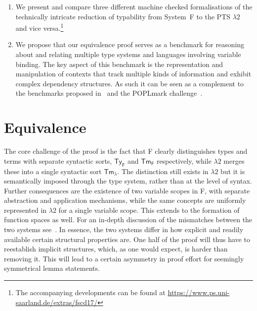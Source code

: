 \documentclass[a4paper,UKenglish]{lipics-v2016}
\newcommand{\SysL}{$\lambda2$\xspace}
\newcommand{\TyF}{\ensuremath{\mathsf{Ty_{F}}}}
\newcommand{\TmF}{\ensuremath{\mathsf{Tm_{F}}}}
\newcommand{\TmL}{\ensuremath{\mathsf{Tm_{\lambda}}}}
\theoremstyle{plain}
\begin{document}
\begin{enumerate}
\item We present and compare three different machine checked formalisations of the technically intricate reduction of typability from System~F to the PTS \SysL and vice versa.\footnote{The accompanying developments can be found at \url{https://www.ps.uni-saarland.de/extras/fscd17/}}
\item We propose that our equivalence proof serves as a benchmark for reasoning about and relating multiple type systems and languages involving variable binding.
  The key aspect of this benchmark is the representation and manipulation of contexts that track multiple kinds of information and exhibit complex dependency structures.
  As such it can be seen as a complement to the benchmarks proposed in~\cite{Felty:ITP10,Felty:orbi-survey} and the POPLmark challenge~\cite{poplmark}.
\end{enumerate}

\section{Equivalence}
\label{sec:equi}

The core challenge of the proof is the fact that F clearly distinguishes types and terms with separate syntactic sorts, $\TyF$ and $\TmF$ respectively, while \SysL merges these into a single syntactic sort $\TmL$.
The distinction still exists in \SysL but it is semantically imposed through the type system, rather than at the level of syntax.
Further consequences are the existence of two variable scopes in F, with separate abstraction and application mechanisms, while the same concepts are uniformly represented in \SysL for a single variable scope.
This extends to the formation of function spaces as well.
For an in-depth discussion of the mismatches between the two systems see~\cite{KaiserEtAl:2017:sysf_pts_equiv_coq}.
In essence, the two systems differ in how explicit and readily available certain structural properties are.
One half of the proof will thus have to reestablish implicit structures, which, as one would expect, is harder than removing it.
This will lead to a certain asymmetry in proof effort for seemingly symmetrical lemma statements.

\end{document}

